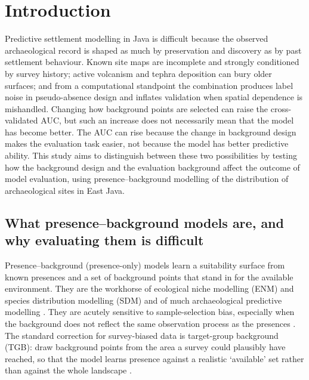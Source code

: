 \documentclass[12pt]{article}
\begin{document}
\section{Introduction}

Predictive settlement modelling in Java is difficult because the observed archaeological record is shaped as much by preservation and discovery as by past settlement behaviour.
Known site maps are incomplete and strongly conditioned by survey history; active volcanism and tephra deposition can bury older surfaces; and from a computational standpoint the combination produces label noise in pseudo-absence design and inflates validation when spatial dependence is mishandled.
Changing how background points are selected can raise the cross-validated AUC, but such an increase does not necessarily mean that the model has become better.
The AUC can rise because the change in background design makes the evaluation task easier, not because the model has better predictive ability.
This study aims to distinguish between these two possibilities by testing how the background design and the evaluation background affect the outcome of model evaluation, using presence--background modelling of the distribution of archaeological sites in East Java.

\subsection{What presence--background models are, and why evaluating them is difficult}

Presence--background (presence-only) models learn a suitability surface from known presences and a set of background points that stand in for the available environment.
They are the workhorse of ecological niche modelling (ENM) and species distribution modelling (SDM) \citep{elith2006, phillips2006} and of much archaeological predictive modelling \citep{verhagen2012, kvamme2006}.
They are acutely sensitive to sample-selection bias, especially when the background does not reflect the same observation process as the presences \citep{phillips2009, araujo2006, wisz2009, lobo2010}.
The standard correction for survey-biased data is target-group background (TGB): draw background points from the area a survey could plausibly have reached, so that the model learns presence against a realistic `available' set rather than against the whole landscape \citep{phillips2009}.
\end{document}
